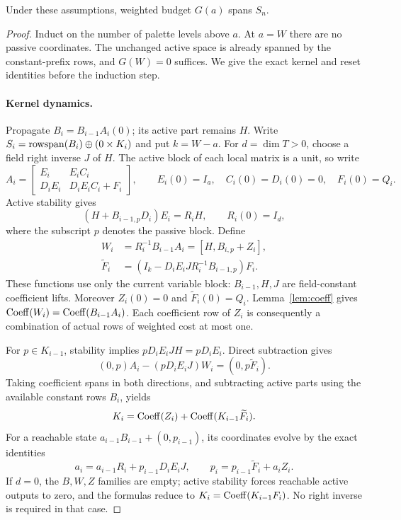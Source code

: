 \begin{lemma}\label{lem:weighted}
Under these assumptions, weighted budget $G(a)$ spans $S_n$.
\end{lemma}
\begin{proof}
Induct on the number of palette levels above $a$. At $a=W$ there
are no passive coordinates. The unchanged active space is already
spanned by the constant-prefix rows, and $G(W)=0$ suffices.
We give the exact kernel and reset identities before the induction step.

\paragraph{Kernel dynamics.}
Propagate $B_i=B_{i-1}A_i(0)$; its active part remains $H$. Write
$S_i=\operatorname{rowspan}(B_i)\oplus(0\times K_i)$ and put $k=W-a$.
For $d=\dim T>0$, choose a field right inverse $J$ of $H$.
The active block of each local matrix is a unit, so write
\[
 A_i=\begin{bmatrix}
 E_i&E_iC_i\\D_iE_i&D_iE_iC_i+F_i
 \end{bmatrix},\qquad
 E_i(0)=I_a,\quad C_i(0)=D_i(0)=0,\quad F_i(0)=Q_i.
\]
Active stability gives
\[
 (H+B_{i-1,p}D_i)E_i=R_iH,\qquad R_i(0)=I_d,
\]
where the subscript $p$ denotes the passive block. Define
\begin{align}
 W_i&=R_i^{-1}B_{i-1}A_i=[H,B_{i,p}+Z_i],\label{eq:Wi}\\
 \widetilde F_i&=(I_k-D_iE_iJR_i^{-1}B_{i-1,p})F_i.\label{eq:Fi}
\end{align}
These functions use only the current variable block: $B_{i-1},H,J$
are field-constant coefficient lifts. Moreover $Z_i(0)=0$ and
$\widetilde F_i(0)=Q_i$. Lemma~\ref{lem:coeff} gives
$\operatorname{Coeff}(W_i)=\operatorname{Coeff}(B_{i-1}A_i)$. Each coefficient row of $Z_i$
is consequently a combination of actual rows of weighted cost at most
one.

For $p\in K_{i-1}$, stability implies $pD_iE_iJH=pD_iE_i$.
Direct subtraction gives
\[
 (0,p)A_i-(pD_iE_iJ)W_i=(0,p\widetilde F_i).
\]
Taking coefficient spans in both directions, and subtracting active
parts using the available constant rows $B_i$, yields
\begin{equation}\label{eq:KD}
 K_i=\operatorname{Coeff}(Z_i)+\operatorname{Coeff}(K_{i-1}\widetilde F_i).
\end{equation}
For a reachable state $a_{i-1}B_{i-1}+(0,p_{i-1})$, its coordinates
evolve by the exact identities
\begin{equation}\label{eq:EV}
 a_i=a_{i-1}R_i+p_{i-1}D_iE_iJ,\qquad
 p_i=p_{i-1}\widetilde F_i+a_iZ_i.
\end{equation}
If $d=0$, the $B,W,Z$ families are empty; active stability forces
reachable active outputs to zero, and the formulas reduce to
$K_i=\operatorname{Coeff}(K_{i-1}F_i)$. No right inverse is required in that case.


\end{proof}
